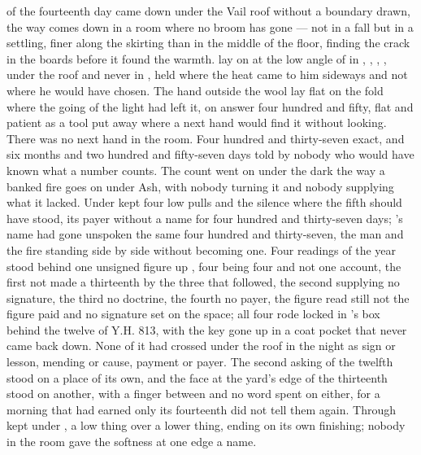 
 of the fourteenth day came down under the Vail roof without a boundary drawn, the way  comes down in a room where no broom has gone --- not in a fall but in a settling, finer along the skirting than in the middle of the floor, finding the crack in the boards before it found the warmth.  lay on  at the low angle of  in , , , , under the roof and never in , held where the heat came to him sideways and not where he would have chosen. The hand outside the wool lay flat on the fold where the going of the light had left it, on answer four hundred and fifty, flat and patient as a tool put away where a next hand would find it without looking. There was no next hand in the room. Four hundred and thirty-seven exact, and six months and two hundred and fifty-seven days told by nobody who would have known what a number counts. The count went on under the dark the way a banked fire goes on under Ash, with nobody turning it and nobody supplying what it lacked. Under   kept four low pulls and the silence where the fifth should have stood, its payer without a name for four hundred and thirty-seven days; 's name had gone unspoken the same four hundred and thirty-seven, the man and the fire standing side by side without becoming one. Four readings of the year stood behind one unsigned figure up , four being four and not one account, the first not made a thirteenth by the three that followed, the second supplying no signature, the third no doctrine, the fourth no payer, the figure read still not the figure paid and no signature set on the space; all four rode locked in 's box behind the twelve of Y.H. 813, with the key gone up in a coat pocket that never came back down. None of it had crossed under the roof in the night as sign or lesson, mending or cause, payment or payer. The second asking of the twelfth stood on a place of its own, and the face at the yard's edge of the thirteenth stood on another, with a finger between and no word spent on either, for a morning that had earned only its fourteenth did not tell them again. Through   kept  under , a low thing over a lower thing, ending on its own finishing; nobody in the room gave the softness at one edge a name.

